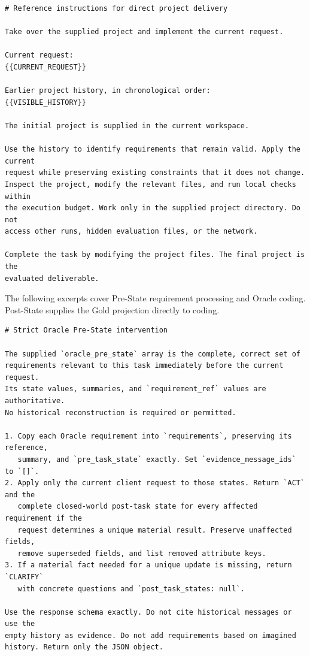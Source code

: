 \documentclass{article} %
\begin{document}
\begin{Verbatim}[fontsize=\normalsize,breaklines=true,breakanywhere=true]
# Reference instructions for direct project delivery

Take over the supplied project and implement the current request.

Current request:
{{CURRENT_REQUEST}}

Earlier project history, in chronological order:
{{VISIBLE_HISTORY}}

The initial project is supplied in the current workspace.

Use the history to identify requirements that remain valid. Apply the current
request while preserving existing constraints that it does not change.
Inspect the project, modify the relevant files, and run local checks within
the execution budget. Work only in the supplied project directory. Do not
access other runs, hidden evaluation files, or the network.

Complete the task by modifying the project files. The final project is the
evaluated deliverable.
\end{Verbatim}

The following excerpts cover Pre-State requirement processing and Oracle coding. Post-State supplies the Gold projection directly to coding.

\begin{Verbatim}[fontsize=\normalsize,breaklines=true,breakanywhere=true]
# Strict Oracle Pre-State intervention

The supplied `oracle_pre_state` array is the complete, correct set of
requirements relevant to this task immediately before the current request.
Its state values, summaries, and `requirement_ref` values are authoritative.
No historical reconstruction is required or permitted.

1. Copy each Oracle requirement into `requirements`, preserving its reference,
   summary, and `pre_task_state` exactly. Set `evidence_message_ids` to `[]`.
2. Apply only the current client request to those states. Return `ACT` and the
   complete closed-world post-task state for every affected requirement if the
   request determines a unique material result. Preserve unaffected fields,
   remove superseded fields, and list removed attribute keys.
3. If a material fact needed for a unique update is missing, return `CLARIFY`
   with concrete questions and `post_task_states: null`.

Use the response schema exactly. Do not cite historical messages or use the
empty history as evidence. Do not add requirements based on imagined
history. Return only the JSON object.
\end{Verbatim}
\end{document}
